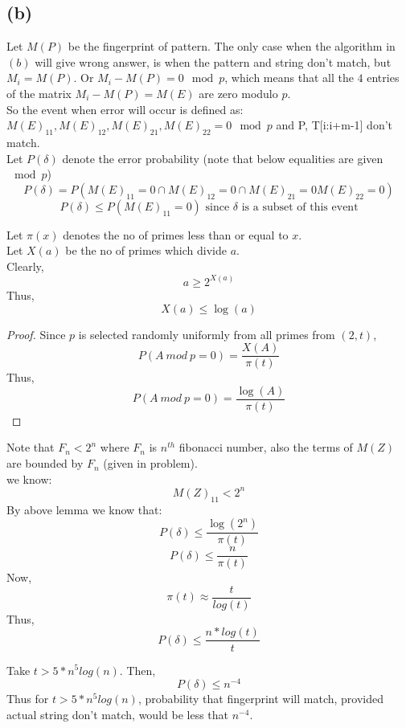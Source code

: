 \documentclass[a4paper]{article}
\begin{document}
\subsection*{(b)}
Let $M(P)$ be the fingerprint of pattern.
The only case when the algorithm in $(b)$ will give wrong answer, is when the pattern and string don't match, but $M_i = M(P)$. Or $M_i - M(P) = 0 \mod p$, which means that all the $4$ entries of the matrix $M_i - M(P) = M(E)$ are zero modulo $p$.\\
So the event when error will occur is defined as: $M(E)_{11}, M(E)_{12}, M(E)_{21}, M(E)_{22} = 0 \mod p$ and P, T[i:i+m-1] don't match. \\
Let $P(\delta)$ denote the error probability (note that below equalities are given $\mod p$)
$$P(\delta) = P(M(E)_{11} = 0 \cap M(E)_{12} = 0 \cap M(E)_{21} = 0 M(E)_{22} = 0)$$
$$P(\delta) \leq P(M(E)_{11} = 0) \text{ since $\delta$ is a subset of this event}$$

Let $\pi(x)$ denotes the no of primes less than or equal to $ x$. \\
Let $X(a)$ be the no of primes which divide $a$. \\
Clearly, $$a \geq 2^{X(a)}$$
Thus, $$X(a) \leq \log(a)$$
\begin{warn}[Lemma 1: Probability that $A\ mod\ p = 0$ when $p$ is a random prime no from $(2,t)$ is less than or equal to $\frac{log(A}{\pi(t)}$.]
\end{warn}

\begin{proof}
Since $p$ is selected randomly uniformly from all primes from $(2,t)$,
$$P(A\ mod\ p = 0) = \frac{X(A)}{\pi(t)}$$
Thus, 
$$P(A\ mod\ p = 0) = \frac{\log (A)}{\pi(t)}$$
\end{proof}
\begin{warn}
\end{warn}
Note that $F_n < 2^n$ where $F_n$ is $n^{th}$ fibonacci number, also the terms of $M(Z)$ are bounded by $F_n$ (given in problem).\\
we know: $$M(Z)_{11} < 2^n$$
By above lemma we know that: $$P(\delta) \leq \dfrac{\log (2^n)}{\pi(t)}$$
$$P(\delta) \leq \frac{n}{\pi(t)}$$
Now,
$$\pi(t) \approx \frac{t}{log(t)}$$
Thus, $$P(\delta) \leq \frac{n*log(t)}{t}$$

Take $t > 5*n^5log(n)$. Then, $$P(\delta) \leq n^{-4}$$
Thus for $t > 5*n^5log(n)$, probability that fingerprint will match, provided actual string don't match, would be less that $n^{-4}$.
\end{document}
